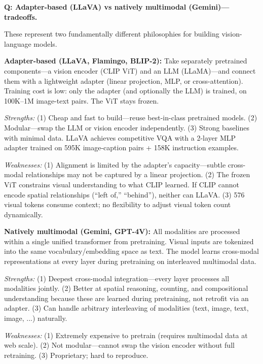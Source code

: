 
\begin{interviewq}
\textbf{Q: Adapter-based (LLaVA) vs natively multimodal (Gemini)---tradeoffs.}

 \quad {} \quad \badgefreq{\freqhigh}

\stronganswer

These represent two fundamentally different philosophies for building vision-language models.

\textbf{Adapter-based (LLaVA, Flamingo, BLIP-2):} Take separately pretrained components---a vision encoder (CLIP ViT) and an LLM (LLaMA)---and connect them with a lightweight adapter (linear projection, MLP, or cross-attention). Training cost is low: only the adapter (and optionally the LLM) is trained, on 100K--1M image-text pairs. The ViT stays frozen.

\textit{Strengths:} (1) Cheap and fast to build---reuse best-in-class pretrained models. (2) Modular---swap the LLM or vision encoder independently. (3) Strong baselines with minimal data. LLaVA achieves competitive VQA with a 2-layer MLP adapter trained on 595K image-caption pairs + 158K instruction examples.

\textit{Weaknesses:} (1) Alignment is limited by the adapter's capacity---subtle cross-modal relationships may not be captured by a linear projection. (2) The frozen ViT constrains visual understanding to what CLIP learned. If CLIP cannot encode spatial relationships (``left of,'' ``behind''), neither can LLaVA. (3) 576 visual tokens consume context; no flexibility to adjust visual token count dynamically.

\textbf{Natively multimodal (Gemini, GPT-4V):} All modalities are processed within a single unified transformer from pretraining. Visual inputs are tokenized into the same vocabulary/embedding space as text. The model learns cross-modal representations at every layer during pretraining on interleaved multimodal data.

\textit{Strengths:} (1) Deepest cross-modal integration---every layer processes all modalities jointly. (2) Better at spatial reasoning, counting, and compositional understanding because these are learned during pretraining, not retrofit via an adapter. (3) Can handle arbitrary interleaving of modalities (text, image, text, image, ...) naturally.

\textit{Weaknesses:} (1) Extremely expensive to pretrain (requires multimodal data at web scale). (2) Not modular---cannot swap the vision encoder without full retraining. (3) Proprietary; hard to reproduce.


\end{interviewq}
